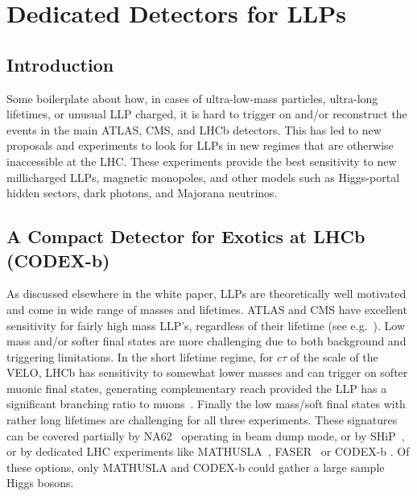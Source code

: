 \section{Dedicated Detectors for LLPs}
\subsection{Introduction}

Some boilerplate about how, in cases of ultra-low-mass particles, ultra-long lifetimes, or unusual LLP charged, it is hard to trigger on and/or reconstruct the events in the main ATLAS, CMS, and LHCb detectors. This has led to new proposals and experiments to look for LLPs in new regimes that are otherwise inaccessible at the LHC. These experiments provide the best sensitivity to new millicharged LLPs, magnetic monopoles, and other models such as Higgs-portal hidden sectors, dark photons, and Majorana neutrinos.


\subsection{A Compact Detector for Exotics at LHCb (CODEX-b)}
\label{sec:CODEX-b}

As discussed elsewhere in the white paper, LLPs are theoretically well motivated and come in wide range of masses and lifetimes. ATLAS and CMS have excellent sensitivity for fairly high mass LLP's, regardless of their lifetime  (see e.g.~\cite{CMS-PAS-EXO-16-036,Aaboud:2016dgf,CMS-PAS-EXO-16-003,ATLAS-CONF-2016-103}). Low mass and/or softer final states are more challenging due to both background and triggering limitations. In the short lifetime regime, for $c\tau$ of the scale of the VELO, LHCb has sensitivity to somewhat lower masses and can trigger on softer muonic final states, generating complementary reach provided the LLP has a significant branching ratio to muons~\cite{Aaij:2017mic,Aaij:2016xmb,Aaij:2016isa,Aaij:2015ica,Aaij:2014nma}. Finally the low mass/soft final states with rather long lifetimes are challenging for all three experiments. These signatures can be covered partially by NA62~\cite{NA62:2017rwk} operating in beam dump mode, or by SHiP~\cite{Alekhin:2015byh}, or by dedicated LHC experiments like MATHUSLA~\cite{Chou:2016lxi}, FASER~\cite{Feng:2017uoz} or CODEX-b \cite{Gligorov:2017nwh}. Of these options, only MATHUSLA and CODEX-b could gather a large sample Higgs bosons.



